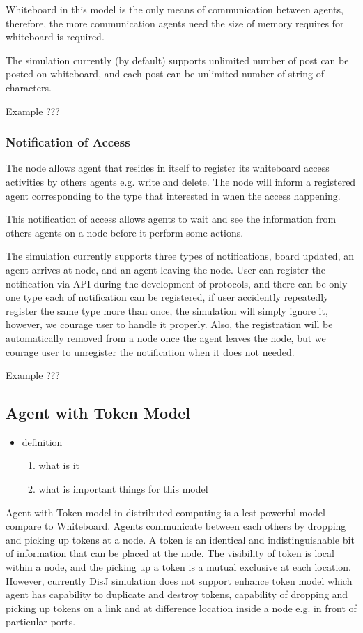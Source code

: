 Whiteboard in this model is the only means of communication between agents, therefore, the more communication agents need the size of memory requires for whiteboard is required.

The simulation currently (by default) supports unlimited number of post can be posted on whiteboard, and each post can be unlimited number of string of characters.

Example ???

\subsubsection*{Notification of Access}
The node allows agent that resides in itself to register its whiteboard access activities by others agents e.g. write and delete. The node will inform a registered agent corresponding to the type that interested in when the access happening.

This notification of access allows agents to wait and see the information from others agents on a node before it perform some actions.

The simulation currently supports three types of notifications, board updated, an agent arrives at node, and an agent leaving the node. User can register the notification via API during the development of protocols, and there can be only one type each of notification can be registered, if user accidently repeatedly register the same type more than once, the simulation will simply ignore it, however, we courage user to handle it properly. Also, the registration will be automatically removed from a node once the agent leaves the node, but we courage user to unregister the notification when it does not needed.

Example ???


\subsection{Agent with Token Model}

\begin{itemize}
\item definition
    \begin{enumerate}
    \item what is it
    \item what is important things for this model
    \end{enumerate}
\end{itemize}

Agent with Token model in distributed computing is a lest powerful model compare to Whiteboard. Agents communicate between each others by dropping and picking up tokens at a node. A token is an identical and indistinguishable bit of information that can be placed at the node. The visibility of token is local within a node, and the picking up a token is a mutual exclusive at each location. However, currently DisJ simulation does not support enhance token model which agent has capability to duplicate and destroy tokens, capability of dropping and picking up tokens on a link and at difference location inside a node e.g. in front of particular ports.

